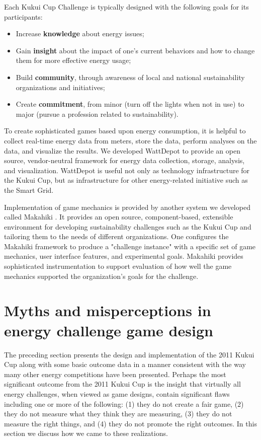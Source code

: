 \documentclass[jou]{apa} %
\begin{document}
Each Kukui Cup Challenge is typically designed with the following goals for its participants:
\begin{itemize}
\item Increase {\bf knowledge} about energy issues;
\item Gain {\bf insight} about the impact of one's current behaviors and how to change
  them for more effective energy usage;
\item Build {\bf community}, through awareness of local and national sustainability organizations and initiatives;
\item Create {\bf commitment}, from minor (turn off the lights when not in use) to major (pursue a profession related to sustainability).
\end{itemize}

To create sophisticated games based upon energy consumption, it is helpful to
collect real-time energy data from meters, store the data, perform analyses on the data, and
visualize the results. We developed WattDepot \cite{csdl2-10-05} to provide an open source, vendor-neutral
framework for energy data collection, storage, analysis, and visualization.  WattDepot is
useful not only as technology infrastructure for the Kukui Cup, but as infrastructure for
other energy-related initiative such as the Smart Grid.

Implementation of game mechanics is provided by another system we developed called
Makahiki \cite{csdl2-11-07}.  It provides an open source, component-based, extensible environment for
developing sustainability challenges such as the Kukui Cup and tailoring them to the needs
of different organizations.  One configures the Makahiki framework to produce a "challenge
instance" with a specific set of game mechanics, user interface features, and experimental
goals.  Makahiki provides sophisticated instrumentation to support evaluation of how well
the game mechanics supported the organization's goals for the challenge. 

\section{Myths and misperceptions in energy challenge game design}

The preceding section presents the design and implementation of the 2011 Kukui Cup along
with some basic outcome data in a manner consistent with the way many other energy
competitions have been presented.  Perhaps the most significant outcome from the 2011
Kukui Cup is the insight that virtually all energy challenges, when viewed as game
designs, contain significant flaws including one or more of the following: (1) they do not
create a fair game, (2) they do not measure what they think they are measuring, (3) they do not
measure the right things, and (4) they do not promote the right outcomes.  In this section we
discuss how we came to these realizations.
\end{document}
